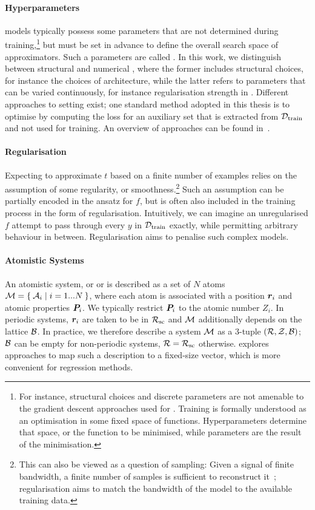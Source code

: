 \clearpage
\paragraph{Hyperparameters} \ml models typically possess some parameters that are not determined during training,\footnote{For instance, structural choices and discrete parameters are not amenable to the gradient descent approaches used for \nns. Training is formally understood as an optimisation in some fixed space of functions. Hyperparameters determine that space, or the function to be minimised, while parameters are the result of the minimisation.} but must be set in advance to define the overall search space of approximators. Such a parameters are called \hps. In this work, we distinguish between structural and numerical \hps, where the former includes structural choices, for instance the choices of \nn architecture, while the latter refers to parameters that can be varied continuously, for instance regularisation strength in \krr. Different approaches to setting \hps exist; one standard method adopted in this thesis is to optimise \hps by computing the loss for an auxiliary  set that is extracted from $\mathcal{D}_{\text{train}}$ and not used for training. An overview of approaches can be found in~\cite[ch.~5]{rasmussen2006}.

\paragraph{Regularisation} Expecting to approximate $t$ based on a finite number of examples relies on the assumption of some regularity, or smoothness.\footnote{This can also be viewed as a question of sampling: Given a signal of finite bandwidth, a finite number of samples is sufficient to reconstruct it~\cite{s1949m}; regularisation aims to match the bandwidth of the model to the available training data.} Such an assumption can be partially encoded in the ansatz for $f$, but is often also included in the training process in the form of regularisation. Intuitively, we can imagine an unregularised $f$ attempt to pass through every $y$ in $\mathcal{D}_{\text{train}}$ exactly, while permitting arbitrary behaviour in between. Regularisation aims to penalise such complex models.~\cite{tikhonov1995}


\paragraph{Atomistic Systems} An atomistic system, or  or  is described as a set of $N$ atoms $\mathcal{M} = \Set{\mathcal{A}_i | i=1...N}$, where each atom is associated with a position $\boldsymbol{r}_i$ and atomic properties $\boldsymbol{P}_i$. We typically restrict $\boldsymbol{P}_i$ to the atomic number $Z_i$. In periodic systems, $\boldsymbol{r}_i$ are taken to be in $\mathcal{R_{\text{sc}}}$ and $\mathcal{M}$ additionally depends on the lattice $\mathcal{B}$. In practice, we therefore describe a system $\mathcal{M}$ as a 3-tuple $(\mathcal{R}, \mathcal{Z}, \mathcal{B})$; $\mathcal{B}$ can be empty for non-periodic systems, $\mathcal{R} = \mathcal{R_{\text{sc}}}$ otherwise.  explores approaches to map such a description to a fixed-size vector, which is more convenient for regression methods.

